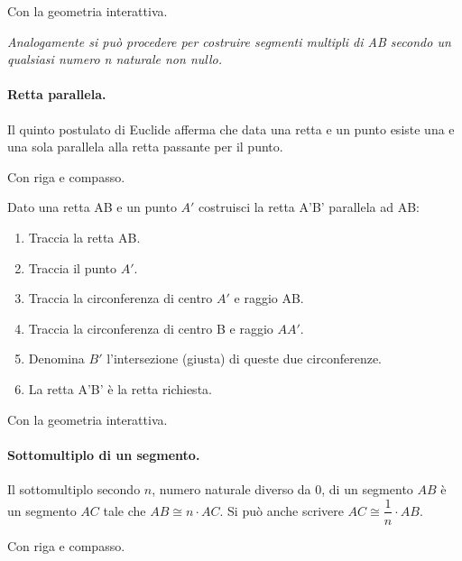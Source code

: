 \ifcoding
Con la geometria interattiva.


\fi

\textit{Analogamente si può procedere per costruire segmenti multipli di AB 
secondo un qualsiasi numero n naturale non nullo.}

\paragraph{Retta parallela.} Il quinto postulato di Euclide afferma che data 
una retta e un punto esiste una e una sola parallela alla retta passante per il 
punto.

Con riga e compasso.

\begin{procedura}\label{proc:fonda_parallela}
  Dato una retta AB e un punto \(A'\) costruisci la retta A'B' parallela ad AB:
  \begin{enumerate} [nosep]
    \item 
    Traccia la retta AB.    
    \item 
    Traccia il punto \(A'\).    
    \item 
    Traccia la circonferenza di centro \(A'\) e raggio AB.   
    \item 
    Traccia la circonferenza di centro B e raggio \(AA'\).
    \item 
    Denomina \(B'\) l'intersezione (giusta) di queste due circonferenze. 
    \item 
    La retta A'B' è la retta richiesta.    
  \end{enumerate}
\end{procedura}

\ifcoding
Con la geometria interattiva.


\fi

\paragraph{Sottomultiplo di un segmento.} Il sottomultiplo secondo 
$n$, numero naturale diverso da 0, di un segmento $AB$ è un segmento 
$AC$ tale che $AB\cong n\cdot AC$. Si può anche scrivere $AC \cong 
\dfrac{1}{n}\cdot AB$.

Con riga e compasso.

